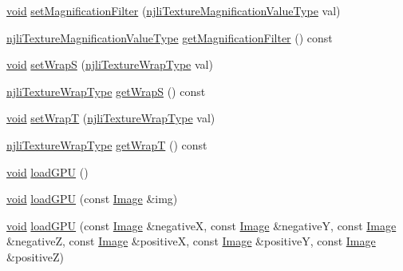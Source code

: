 \begin{DoxyCompactItemize}
\item 
\mbox{\hyperlink{_thread_8h_af1e856da2e658414cb2456cb6f7ebc66}{void}} \mbox{\hyperlink{classnjli_1_1_material_property_ac8519825cbf12f274d2cfea9d1afcc64}{set\+Magnification\+Filter}} (\mbox{\hyperlink{namespacenjli_a9fe7a080d946c5be3afc71d834dc7902}{njli\+Texture\+Magnification\+Value\+Type}} val)
\item 
\mbox{\hyperlink{namespacenjli_a9fe7a080d946c5be3afc71d834dc7902}{njli\+Texture\+Magnification\+Value\+Type}} \mbox{\hyperlink{classnjli_1_1_material_property_aa5f65e3731941c88cc6600b414a8b1dd}{get\+Magnification\+Filter}} () const
\item 
\mbox{\hyperlink{_thread_8h_af1e856da2e658414cb2456cb6f7ebc66}{void}} \mbox{\hyperlink{classnjli_1_1_material_property_a373bb320a2411e19eb79b376bdace858}{set\+WrapS}} (\mbox{\hyperlink{namespacenjli_a6e9496d4850ec7151f04a220e1979b62}{njli\+Texture\+Wrap\+Type}} val)
\item 
\mbox{\hyperlink{namespacenjli_a6e9496d4850ec7151f04a220e1979b62}{njli\+Texture\+Wrap\+Type}} \mbox{\hyperlink{classnjli_1_1_material_property_a88eebd11319add4290b5d7d28a177161}{get\+WrapS}} () const
\item 
\mbox{\hyperlink{_thread_8h_af1e856da2e658414cb2456cb6f7ebc66}{void}} \mbox{\hyperlink{classnjli_1_1_material_property_a085c669a1f7e6df12a6e8bcabd70a176}{set\+WrapT}} (\mbox{\hyperlink{namespacenjli_a6e9496d4850ec7151f04a220e1979b62}{njli\+Texture\+Wrap\+Type}} val)
\item 
\mbox{\hyperlink{namespacenjli_a6e9496d4850ec7151f04a220e1979b62}{njli\+Texture\+Wrap\+Type}} \mbox{\hyperlink{classnjli_1_1_material_property_ad83676a4a57a35e1e8f4ece4942ab300}{get\+WrapT}} () const
\item 
\mbox{\hyperlink{_thread_8h_af1e856da2e658414cb2456cb6f7ebc66}{void}} \mbox{\hyperlink{classnjli_1_1_material_property_ad96612e3ed0bd7e7ee02007e4a7e6449}{load\+G\+PU}} ()
\item 
\mbox{\hyperlink{_thread_8h_af1e856da2e658414cb2456cb6f7ebc66}{void}} \mbox{\hyperlink{classnjli_1_1_material_property_ac710f73d560118360ab73f5bf87cf016}{load\+G\+PU}} (const \mbox{\hyperlink{classnjli_1_1_image}{Image}} \&img)
\item 
\mbox{\hyperlink{_thread_8h_af1e856da2e658414cb2456cb6f7ebc66}{void}} \mbox{\hyperlink{classnjli_1_1_material_property_aff66a14be2c9117f8620cd2bab88f9b5}{load\+G\+PU}} (const \mbox{\hyperlink{classnjli_1_1_image}{Image}} \&negativeX, const \mbox{\hyperlink{classnjli_1_1_image}{Image}} \&negativeY, const \mbox{\hyperlink{classnjli_1_1_image}{Image}} \&negativeZ, const \mbox{\hyperlink{classnjli_1_1_image}{Image}} \&positiveX, const \mbox{\hyperlink{classnjli_1_1_image}{Image}} \&positiveY, const \mbox{\hyperlink{classnjli_1_1_image}{Image}} \&positiveZ)

\end{DoxyCompactItemize}

